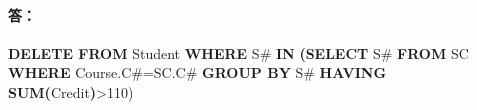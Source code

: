 \paragraph{答：}
\textbf{DELETE FROM} Student \textbf{WHERE} S\# \textbf{IN} \textbf{(SELECT} S\# \textbf{FROM} SC \textbf{WHERE} Course.C\#=SC.C\# \textbf{GROUP BY} S\# \textbf{HAVING SUM(}Credit\textbf{)}>110)